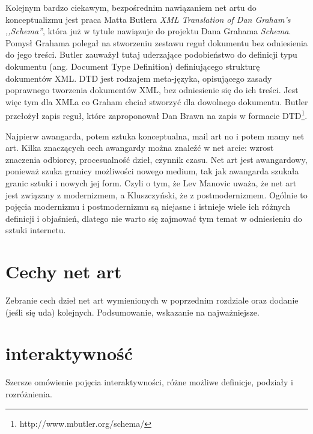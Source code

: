 \documentclass[a4paper,12pt,twoside]{article}
\begin{document}

Kolejnym bardzo ciekawym, bezpośrednim nawiązaniem net artu do konceptualizmu
jest praca Matta Butlera \textit{XML Translation of Dan Graham's ,,Schema''},
która już w tytule nawiązuje do projektu Dana Grahama \textit{Schema}. 
Pomysł Grahama polegał na stworzeniu zestawu reguł dokumentu bez odniesienia
do jego treści. Butler zauważył tutaj uderzające podobieństwo do definicji
typu dokumentu (ang. Document Type Definition) definiującego strukturę
dokumentów XML. DTD jest rodzajem meta-języka, opisującego zasady poprawnego
tworzenia dokumentów XML, bez odniesienie się do ich treści. Jest więc tym
dla XMLa co Graham chciał stworzyć dla dowolnego dokumentu.
Butler przełożył zapis reguł, które zaproponował Dan Brawn na zapis w formacie
DTD\footnote{http://www.mbutler.org/schema/}.

Najpierw awangarda, potem sztuka konceptualna, mail art no i potem mamy
net art. Kilka znaczących cech awangardy można znaleźć w net arcie:
wzrost znaczenia odbiorcy, procesualność dzieł, czynnik czasu.
Net art jest awangardowy, ponieważ szuka granicy możliwości nowego
medium, tak jak awangarda szukała granic sztuki i nowych jej form.
Czyli o tym, że Lev Manovic uważa, że net art jest związany z modernizmem,
a Kluszczyński, że z postmodernizmem. Ogólnie to pojęcia modernizmu
i postmodernizmu są niejasne i istnieje wiele ich różnych definicji
i objaśnień, dlatego nie warto się zajmować tym temat w odniesieniu
do sztuki internetu.


\section{Cechy net art}
Zebranie cech dzieł net art wymienionych
w poprzednim rozdziale oraz dodanie (jeśli się uda) kolejnych.
Podsumowanie, wskazanie na najważniejsze.

\section{interaktywność}
Szersze omówienie pojęcia interaktywności, różne możliwe
definicje, podziały i rozróżnienia.
\end{document}
